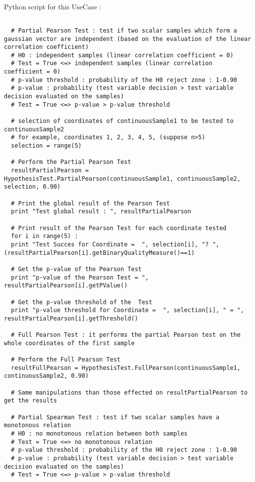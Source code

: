 \textspace\\
Python script for this UseCase :

\begin{lstlisting}

  # Partial Pearson Test : test if two scalar samples which form a gaussian vector are independent (based on the evaluation of the linear correlation coefficient)
  # H0 : independent samples (linear correlation coefficient = 0)
  # Test = True <=> independent samples (linear correlation coefficient = 0)
  # p-value threshold : probability of the H0 reject zone : 1-0.90
  # p-value : probability (test variable decision > test variable decision evaluated on the samples)
  # Test = True <=> p-value > p-value threshold

  # selection of coordinates of continuousSample1 to be tested to continuousSample2
  # for example, coordinates 1, 2, 3, 4, 5, (suppose n>5)
  selection = range(5)

  # Perform the Partial Pearson Test
  resultPartialPearson = HypothesisTest.PartialPearson(continuousSample1, continuousSample2, selection, 0.90)

  # Print the global result of the Pearson Test
  print "Test global result : ", resultPartialPearson

  # Print result of the Pearson Test for each coordinate tested
  for i in range(5) :
  print "Test Succes for Coordinate =  ", selection[i], "? ", (resultPartialPearson[i].getBinaryQualityMeasure()==1)

  # Get the p-value of the Pearson Test
  print "p-value of the Pearson Test = ", resultPartialPearson[i].getPValue()

  # Get the p-value threshold of the  Test
  print "p-value threshold for Coordinate =  ", selection[i], " = ", resultPartialPearson[i].getThreshold()

  # Full Pearson Test : it performs the partial Pearson test on the whole coordinates of the first sample

  # Perform the Full Pearson Test
  resultFullPearson = HypothesisTest.FullPearson(continuousSample1, continuousSample2, 0.90)

  # Same manipulations than those effected on resultPartialPearson to get the results

  # Partial Spearman Test : test if two scalar samples have a monotonous relation
  # H0 : no monotonous relation between both samples
  # Test = True <=> no monotonous relation
  # p-value threshold : probability of the H0 reject zone : 1-0.90
  # p-value : probability (test variable decision > test variable decision evaluated on the samples)
  # Test = True <=> p-value > p-value threshold


\end{lstlisting}
